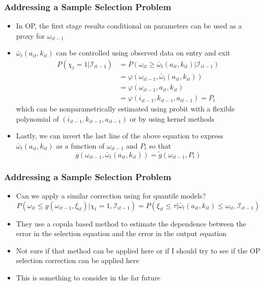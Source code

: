 \documentclass{beamer}
\begin{document}
\begin{frame}
\frametitle{Addressing a Sample Selection Problem}
\begin{itemize}
	\item In OP, the first stage results conditional on parameters can be used as a proxy for $\omega_{it-1}$
	\item $\bar{\omega}_{t}(a_{it}, k_{it})$ can be controlled using observed data on entry and exit
	\begin{equation}
	\begin{split}
	P(\chi_{t}=1|\mathcal{I}_{it-1})&=P(\omega_{it}\geq\bar{\omega}_{t}(a_{it}, k_{it})|\mathcal{I}_{it-1})\\
	&=\varphi(\omega_{it-1}, \bar{\omega}_{t}(a_{it}, k_{it}))\\
	&=\varphi(\omega_{it-1}, a_{it}, k_{it})\\
	&=\varphi(i_{it-1}, k_{it-1}, a_{it-1})=P_{t}
	\end{split}
	\end{equation}
	which can be nonparametrically estimated using probit with a flexible polynomial of $(i_{it-1}, k_{it-1}, a_{it-1})$ or by using kernel methods
	\item Lastly, we can invert the last line of the above equation to express $\bar{\omega}_{t}(a_{it}, k_{it})$ as a function of $\omega_{it-1}$ and $P_{t}$ so that
	\begin{equation}
	g(\omega_{it-1}, \bar{\omega}_{t}(a_{it}, k_{it}))=\tilde{g}(\omega_{it-1}, P_{t})
	\end{equation}
\end{itemize}
\end{frame}

\begin{frame}
\frametitle{Addressing a Sample Selection Problem}
\begin{itemize}
	\item Can we apply a similar correction using \cite{Arellano2017a} for quantile models?
	\begin{equation}
	P(\omega_{it}\leq g(\omega_{it-1}, \xi_{it})|\chi_{t}=1, \mathcal{I}_{it-1})=P(\xi_{it}\leq \tau|\bar{\omega}_{t}(a_{it}, k_{it})\leq \omega_{it}, \mathcal{I}_{it-1})
	\end{equation}
	\item They use a copula based method to estimate the dependence between the error in the selection equation and the error in the output equation
	\item Not sure if that method can be applied here or if I should try to see if the OP selection correction can be applied here
	\item This is something to consider in the far future
\end{itemize}
\end{frame}
\end{document}
